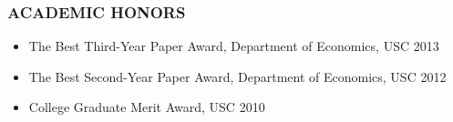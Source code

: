 \documentclass[10pt]{article}
\begin{document}
\subsubsection*{\textcolor{solblue}{ACADEMIC HONORS}}
\begin{itemize}
  \item The Best Third-Year Paper Award, Department of Economics, USC 2013
  \item The Best Second-Year Paper Award, Department of Economics, USC 2012
  \item College Graduate Merit Award, USC 2010
\end{itemize}
\end{document}
